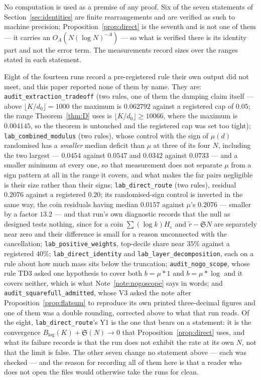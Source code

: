 \documentclass[11pt,a4paper]{article}
\theoremstyle{plain}
\theoremstyle{definition}
\theoremstyle{remark}
\renewcommand{\SS}{\mathfrak{S}}
\begin{document}
No computation is used as a premise of any proof. Six of the seven
statements of Section~\ref{sec:identities} are finite rearrangements
and are verified as such to machine precision;
Proposition~\ref{prop:direct} is the seventh and is not one of them ---
it carries an $O_A(N(\log N)^{-A})$ --- so what is verified there is
its identity part and not the error term. The measurements record
sizes over the ranges stated in each statement.

Eight of the fourteen runs record a pre-registered rule their own
output did not meet, and this paper reported none of them by name.
They are:
\texttt{audit\_extraction\_tradeoff} (two rules, one of them the damping
claim itself --- above $\lfloor K/d_0\rfloor=1000$ the maximum is
$0.062792$ against a registered cap of $0.05$; the range
Theorem~\ref{thm:D} uses is $\lfloor K/d_0\rfloor\ge10066$, where the
maximum is $0.004145$, so the theorem is untouched and the registered
cap was set too tight);
\texttt{lab\_combined\_modulus} (two rules), whose control with the sign
of $\mu(d)$ randomised has a \emph{smaller} median deficit than $\mu$
at three of its four $N$, including the two largest --- $0.0454$
against $0.0547$ and $0.0342$ against $0.0733$ --- and a smaller
minimum at every one, so that measurement does not separate $\mu$ from
a sign pattern at all in the range it covers, and what makes the far
pairs negligible is their size rather than their signs;
\texttt{lab\_direct\_route} (two rules), residual $0.2076$ against a
registered $0.20$; its randomised-sign control is inverted in the same
way, the coin residuals having median $0.0157$ against $\mu$'s
$0.2076$ --- smaller by a factor $13.2$ --- and that run's own
diagnostic records that the null as designed tests nothing, since for
a coin $\sum(\log k)H_\varepsilon$ and $\tilde r-\SS N$ are separately
near zero and their difference is small for a reason unconnected with
the cancellation;
\texttt{lab\_positive\_weights}, top-decile share near $35\%$ against a
registered $40\%$;
\texttt{lab\_direct\_identity} and \texttt{lab\_layer\_decomposition},
each on a rule about how much mass sits below the truncation;
\texttt{audit\_nogo\_scope}, whose rule TD3 asked one hypothesis to
cover both $b=\mu*1$ and $b=\mu*\log$ and it covers neither, which is
what Note~\ref{note:nogoscope} says in words;
and \texttt{audit\_squarefull\_admitted}, whose V3 asked the note after
Proposition~\ref{prop:flatsum} to reproduce its own printed
three-decimal figures and one of them was a double rounding, corrected
above to what that run reads.
Of the eight, \texttt{lab\_direct\_route}'s Y1 is the one that bears on
a statement: it is the convergence
$B_{\log}(K)+\SS(N)\to0$ that Proposition~\ref{prop:direct} uses, and
what its failure records is that the run does not exhibit the rate at
its own $N$, not that the limit is false. The other seven change no
statement above --- each was checked --- and the reason for recording
all of them here is that a reader who does not open the files would
otherwise take the runs for clean.
\end{document}
